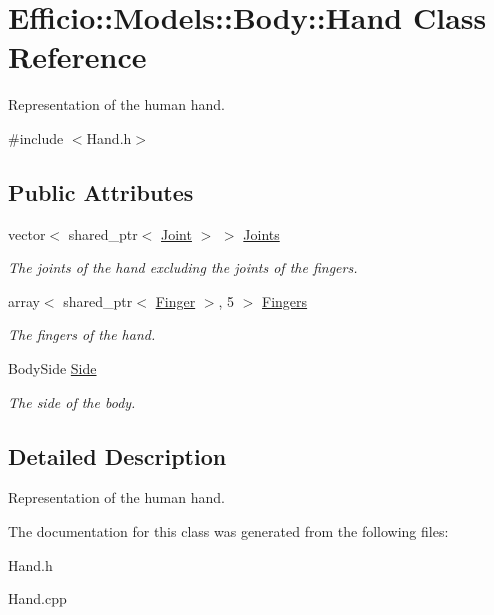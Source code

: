 \hypertarget{class_efficio_1_1_models_1_1_body_1_1_hand}{}\section{Efficio\+:\+:Models\+:\+:Body\+:\+:Hand Class Reference}
\label{class_efficio_1_1_models_1_1_body_1_1_hand}


Representation of the human hand.  




{\ttfamily \#include $<$Hand.\+h$>$}

\subsection*{Public Attributes}
\begin{DoxyCompactItemize}
\item 
vector$<$ shared\+\_\+ptr$<$ \hyperlink{class_efficio_1_1_models_1_1_body_1_1_joint}{Joint} $>$ $>$ \hyperlink{class_efficio_1_1_models_1_1_body_1_1_hand_a4759009c8265994e4ec0f175336a4d8a}{Joints}\hypertarget{class_efficio_1_1_models_1_1_body_1_1_hand_a4759009c8265994e4ec0f175336a4d8a}{}\label{class_efficio_1_1_models_1_1_body_1_1_hand_a4759009c8265994e4ec0f175336a4d8a}

\begin{DoxyCompactList}\small\item\em The joints of the hand excluding the joints of the fingers. \end{DoxyCompactList}\item 
array$<$ shared\+\_\+ptr$<$ \hyperlink{class_efficio_1_1_models_1_1_body_1_1_finger}{Finger} $>$, 5 $>$ \hyperlink{class_efficio_1_1_models_1_1_body_1_1_hand_add3e97a6ca82a646b678884d1a1d7262}{Fingers}\hypertarget{class_efficio_1_1_models_1_1_body_1_1_hand_add3e97a6ca82a646b678884d1a1d7262}{}\label{class_efficio_1_1_models_1_1_body_1_1_hand_add3e97a6ca82a646b678884d1a1d7262}

\begin{DoxyCompactList}\small\item\em The fingers of the hand. \end{DoxyCompactList}\item 
Body\+Side \hyperlink{class_efficio_1_1_models_1_1_body_1_1_hand_af1c8b771ef9cec3af08bbd6ce8f301dc}{Side}\hypertarget{class_efficio_1_1_models_1_1_body_1_1_hand_af1c8b771ef9cec3af08bbd6ce8f301dc}{}\label{class_efficio_1_1_models_1_1_body_1_1_hand_af1c8b771ef9cec3af08bbd6ce8f301dc}

\begin{DoxyCompactList}\small\item\em The side of the body. \end{DoxyCompactList}\end{DoxyCompactItemize}


\subsection{Detailed Description}
Representation of the human hand. 

The documentation for this class was generated from the following files\+:\begin{DoxyCompactItemize}
\item 
Hand.\+h\item 
Hand.\+cpp\end{DoxyCompactItemize}
